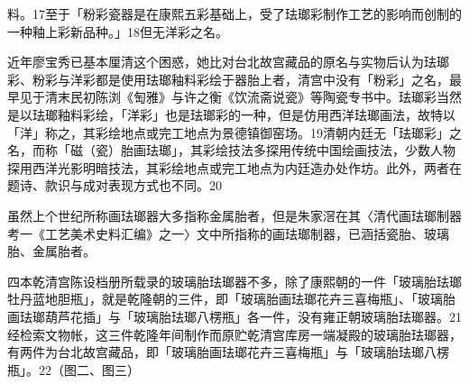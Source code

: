 \vfill
\begin{BookNotes}
\end{BookNotes}


\noindent 料。17至于「粉彩瓷器是在康熙五彩基础上，受了珐瑯彩制作工艺的影响而创制的一种釉上彩新品种。」18但无洋彩之名。

近年廖宝秀已基本厘清这个困惑，她比对台北故宫藏品的原名与实物后认为珐瑯彩、粉彩与洋彩都是使用珐瑯釉料彩绘于器胎上者，清宫中没有「粉彩」之名，最早见于清末民初陈浏《匋雅》与许之衡《饮流斋说瓷》等陶瓷专书中。珐瑯彩当然是以珐瑯釉料彩绘，「洋彩」也是珐瑯彩的一种，但是仿用西洋珐瑯画法，故特以「洋」称之，其彩绘地点或完工地点为景德镇御窑场。19清朝内廷无「珐瑯彩」之名，而称「磁（瓷）胎画珐瑯」，其彩绘技法多探用传统中国绘画技法，少数人物探用西洋光影明暗技法，其彩绘地点或完工地点为内廷造办处作坊。此外，两者在题诗、款识与成对表现方式也不同。20

虽然上个世纪所称画珐瑯器大多指称金属胎者，但是朱家滘在其〈清代画珐瑯制器考一《工艺美术史料汇编》之一〉文中所指称的画珐瑯制器，已涵括瓷胎、玻璃胎、金属胎者。

四本乾清宫陈设档册所载录的玻璃胎珐瑯器不多，除了康熙朝的一件「玻璃胎珐瑯牡丹蓝地胆瓶」，就是乾隆朝的三件，即「玻璃胎画珐瑯花卉三喜梅瓶」、「玻璃胎画珐瑯葫芦花插」与「玻璃胎珐瑯八楞瓶」各一件，没有雍正朝玻璃胎珐瑯器。21经检索文物帐，这三件乾隆年间制作而原贮乾清宫库房一端凝殿的玻璃胎珐瑯器，有两件为台北故宫藏品，即「玻璃胎画珐瑯花卉三喜梅瓶」与「玻璃胎珐瑯八楞瓶」。22（图二、图三）

\vfill
\begin{BookNotes}
\end{BookNotes}

